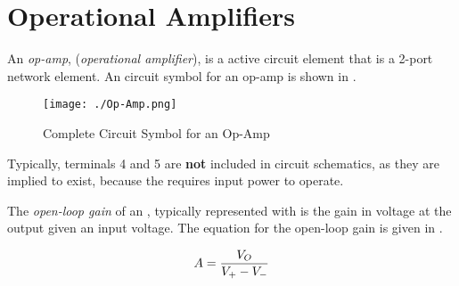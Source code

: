 \section{Operational Amplifiers}\label{sec:Op-Amps}
\begin{definition}[Op-Amp]\label{def:Op-Amp}
  An \emph{op-amp}, (\emph{operational amplifier}), is a active circuit element that is a 2-port network element.
  An circuit symbol for an op-amp is shown in .
\end{definition}

\begin{figure}[h!tbp]
  \centering
  \texttt{[image: ./Op-Amp.png]}
  \caption{Complete Circuit Symbol for an Op-Amp \parencite[p.~60]{sedraTextbook7}}
  \label{fig:Op-Amp}
\end{figure}

Typically, terminals 4 and 5 are \textbf{not} included in circuit schematics, as they are implied to exist, because the  requires input power to operate.

\begin{definition}\label{def:Open-Loop_Gain}
  The \emph{open-loop gain} of an , typically represented with \OpenLoopGain{} is the gain in voltage at the output given an input voltage.
  The equation for the open-loop gain is given in .

  \begin{equation}\label{eq:Open-Loop_Gain}
    A = \frac{V_{O}}{V_{+} - V_{-}}
  \end{equation}
\end{definition}



